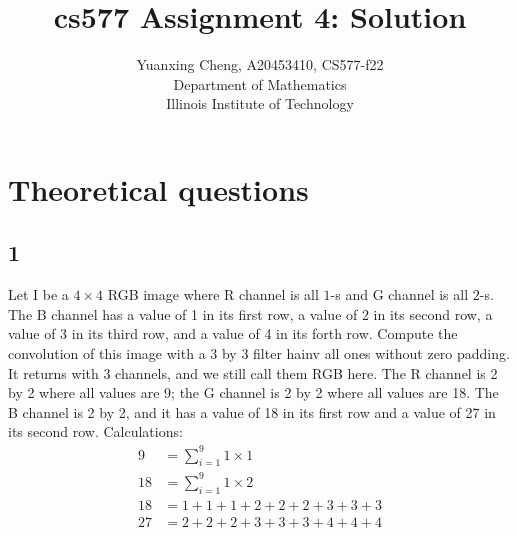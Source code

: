 \documentclass{article}
\title{cs577 Assignment 4: Solution}
\author{Yuanxing Cheng, A20453410, CS577-f22\\ Department of Mathematics \\Illinois Institute of Technology}
\begin{document}
\maketitle

\section*{Theoretical questions}

\subsection*{1}
\begin{myleftlinebox}
    Let I be a \(4\times 4\) RGB image where R channel is all \(1\)-s and G channel is all \(2\)-s. The B channel has a value of 1 in its first row, a value of 2 in its second row, a value of 3 in its third row, and a value of 4 in its forth row. Compute the convolution of this image with a 3 by 3 filter hainv all ones without zero padding.
    \tcblower
    It returns with 3 channels, and we still call them RGB here.
    The R channel is 2 by 2 where all values are 9; the G channel is 2 by 2 where all values are 18. The B channel is 2 by 2, and it has a value of 18 in its first row and a value of 27 in its second row.
    Calculations: 
    \begin{align*}
        9&=\sum_{i=1}^9 1\times 1\\
        18 &=\sum_{i=1}^9 1\times 2\\
        18 &=1+1+1+2+2+2+3+3+3\\
        27 &= 2+2+2+3+3+3+4+4+4
    \end{align*}
\end{myleftlinebox}
\end{document}
